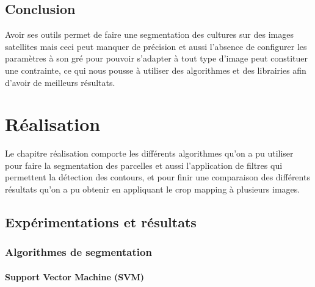 \documentclass[12pt, openany]{report}
\begin{document}
\section*{Conclusion}
Avoir ses outils permet de faire une segmentation des cultures sur des images satellites mais ceci peut manquer de précision et aussi l'absence de configurer les paramètres à son gré pour pouvoir s'adapter à tout type d'image peut constituer une contrainte, ce qui nous pousse à utiliser des algorithmes et des librairies afin d'avoir de meilleurs résultats.


\chapter{Réalisation}

Le chapitre réalisation comporte les différents algorithmes qu'on a pu utiliser pour faire la segmentation des parcelles et aussi l'application de filtres qui permettent la détection des contours, et pour finir une comparaison des différents résultats qu'on a pu obtenir en appliquant le crop mapping à plusieurs images. 



\newpage

\section{Expérimentations et résultats}

\subsection{Algorithmes de segmentation}

\subsubsection{Support Vector Machine (SVM)}
\end{document}
